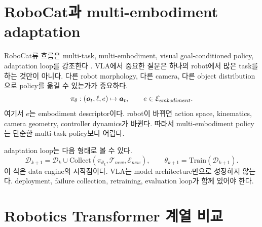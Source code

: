 \section{RoboCat과 multi-embodiment adaptation}

RoboCat류 흐름은 multi-task, multi-embodiment, visual goal-conditioned policy, adaptation loop를 강조한다 \cite{robocat2023}. VLA에서 중요한 질문은 하나의 robot에서 많은 task를 하는 것만이 아니다. 다른 robot morphology, 다른 camera, 다른 object distribution으로 policy를 옮길 수 있는가가 중요하다.
\begin{equation}
  \pi_{\theta}
  :
  (\bm{o}_t,\ell,e)
  \mapsto
  \bm{a}_t,
  \qquad
  e\in\mathcal{E}_{embodiment}.
  \label{eq:multi-embodiment-policy}
\end{equation}
여기서 $e$는 embodiment descriptor이다. robot이 바뀌면 action space, kinematics, camera geometry, controller dynamics가 바뀐다. 따라서 multi-embodiment policy는 단순한 multi-task policy보다 어렵다.

adaptation loop는 다음 형태로 볼 수 있다.
\begin{equation}
  \mathcal{D}_{k+1}
  =
  \mathcal{D}_{k}
  \cup
  \mathrm{Collect}
  (
  \pi_{\theta_k},\mathcal{T}_{new},\mathcal{E}_{new}
  ),
  \qquad
  \theta_{k+1}
  =
  \mathrm{Train}(\mathcal{D}_{k+1}).
  \label{eq:adaptation-loop}
\end{equation}
이 식은 data engine의 시작점이다. VLA는 model architecture만으로 성장하지 않는다. deployment, failure collection, retraining, evaluation loop가 함께 있어야 한다.

\section{Robotics Transformer 계열 비교}

